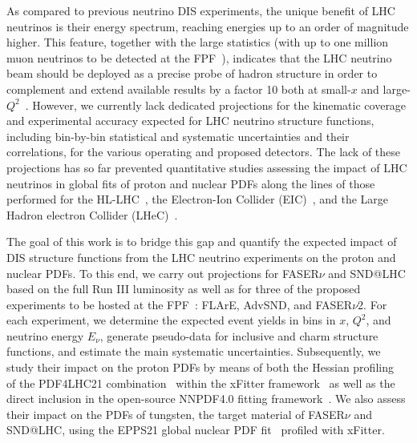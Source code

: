 As compared to  previous neutrino DIS experiments,
the unique benefit of LHC neutrinos is their energy spectrum, reaching
energies up to an order of magnitude higher.
%
This feature, together with the large statistics (with up to one million muon neutrinos to be
detected at the FPF~\cite{Kling:2021gos}),  indicates that the LHC  neutrino beam should be
deployed as a precise probe of hadron structure in order to complement
and extend available results by a factor 10 both at small-$x$
and large-$Q^2$~\cite{Feng:2022inv}.
%
However, we currently lack  dedicated projections for the kinematic coverage
and experimental accuracy expected for LHC neutrino structure functions,
including bin-by-bin statistical and systematic uncertainties and their
correlations, for the various operating and proposed detectors.
%
The lack of these projections
has so far prevented quantitative studies assessing the impact
of LHC neutrinos in global fits of proton and nuclear PDFs along the lines
of those performed for the HL-LHC~\cite{AbdulKhalek:2018rok}, the Electron-Ion Collider (EIC)~\cite{AbdulKhalek:2021gbh,Khalek:2021ulf}, and the
Large Hadron electron Collider (LHeC)~\cite{AbdulKhalek:2019mps,LHeC:2020van}. 

The goal of this work is to bridge this gap and quantify
the expected impact of  DIS structure functions from the LHC
neutrino experiments on the proton and nuclear PDFs.
%
To this end, we carry out projections for  FASER$\nu$ and SND@LHC based on the full Run III luminosity
as well as for  three of the proposed experiments to be hosted
at the FPF~\cite{Anchordoqui:2021ghd,Feng:2022inv}: FLArE, AdvSND, and FASER$\nu$2.
%
For each experiment, we determine the expected event yields in bins in $x$, $Q^2$,
and neutrino energy $E_\nu$,
generate pseudo-data for  inclusive and charm 
structure functions, 
and estimate the main systematic uncertainties.
%
Subsequently, we study their impact on the proton PDFs by means of both the Hessian profiling~\cite{Paukkunen:2014zia,  Schmidt:2018hvu, AbdulKhalek:2018rok, HERAFitterdevelopersTeam:2015cre}
of the PDF4LHC21 combination~\cite{PDF4LHCWorkingGroup:2022cjn}
within the  {\sc\small xFitter} framework~\cite{Alekhin:2014irh, Bertone:2017tig, xFitter:2022zjb, xFitter:web}
as well as the direct inclusion in the open-source NNPDF4.0 fitting framework~\cite{NNPDF:2021uiq}.
%
We also assess their impact on the PDFs of tungsten, the target material of FASER$\nu$ and SND@LHC,
using the EPPS21 global nuclear PDF fit~\cite{Eskola:2021nhw}
profiled with {\sc\small xFitter}.

